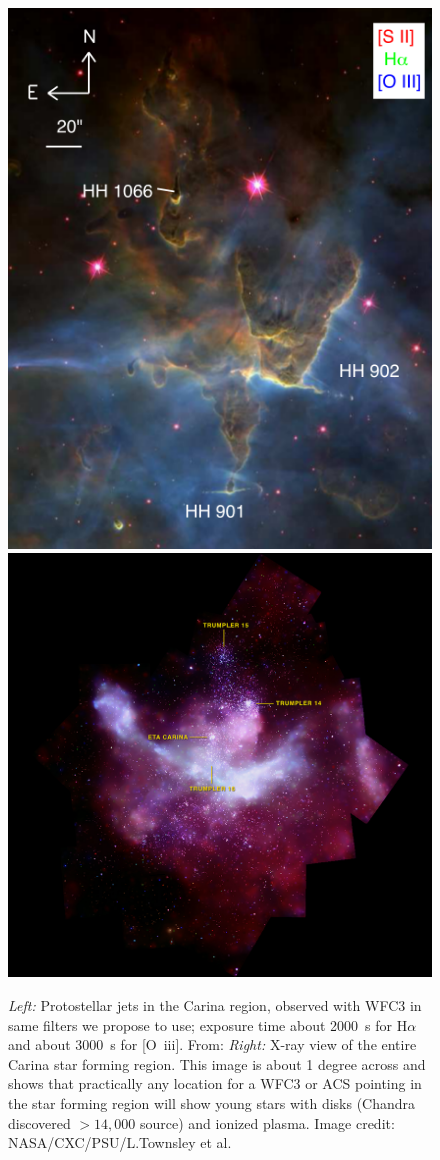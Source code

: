 \documentclass[12pt]{article}
\begin{document}
\begin{figure}
    \centering
    \includegraphics[width=.45\textwidth]{reiter13_fig3.png}
    \includegraphics[width=.54\textwidth]{carina_xray_label.jpg}
    \caption{\emph{Left:} Protostellar jets in the Carina region, observed with WFC3 in same filters we propose to use; exposure time about 2000~s for H$\alpha$ and about 3000~s for [O~{\sc iii}]. From: \citet{2013MNRAS.433.2226R} \emph{Right:} X-ray view of the entire Carina star forming region. This image is about 1 degree across and shows that practically any location for a WFC3 or ACS pointing in the star forming region will show young stars with disks (Chandra discovered $> 14,000$ source) and ionized plasma. Image credit: NASA/CXC/PSU/L.Townsley et al.}
    \label{fig:reiter}
\end{figure}
\end{document}
